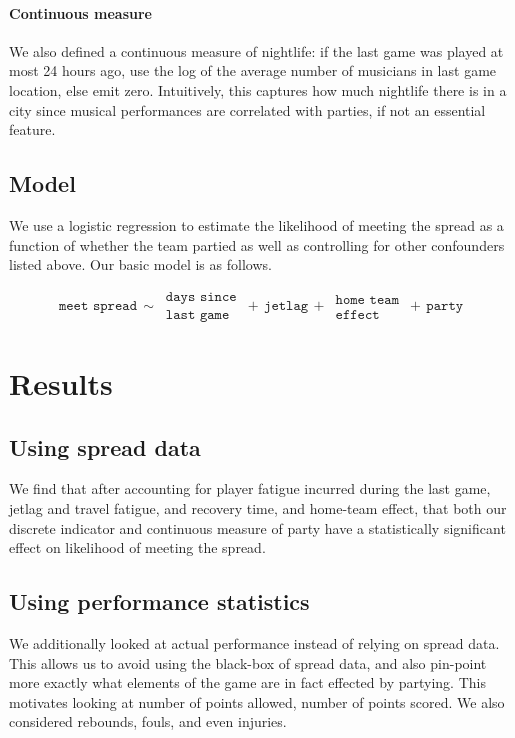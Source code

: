 \documentclass[letterpaper,12pt]{article}
\begin{document}
\paragraph{Continuous measure}
We also defined a continuous measure of nightlife:
if the last game was played at most 24 hours ago, use the log of the average number
of musicians in last game location, else emit zero. Intuitively, this captures
how much nightlife there is in a city since musical performances are correlated
with parties, if not an essential feature.

\subsection{Model} We use a logistic regression to estimate the likelihood of meeting
the spread as a function of whether the team partied as well as controlling for other confounders
listed above. Our basic model is as follows.

\[
\texttt{meet spread} \,  \sim \, \substack{\texttt{days since} \\ \texttt{last game}} \, + \, \texttt{jetlag} \, + \, \substack{\texttt{home team} \\ \texttt{effect}} \, + \, \texttt{party}
\]

\section{Results}
\subsection{Using spread data}
We find that after accounting for player fatigue incurred during the last game, jetlag and travel fatigue, and recovery time, and home-team effect, that both our discrete indicator and continuous measure of party
have a statistically significant effect on likelihood of meeting the spread.


\subsection{Using performance statistics}
We additionally looked at actual performance instead of relying on spread data. 
This allows us to avoid using the black-box of spread data, and also pin-point
more exactly what elements of the game are in fact effected by partying.
This motivates looking at number of points allowed, number of points scored.
We also considered rebounds, fouls, and even injuries. 
\end{document}
